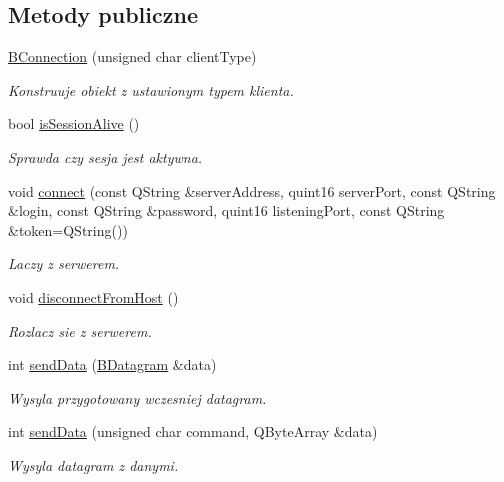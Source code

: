 \subsection*{Metody publiczne}
\begin{DoxyCompactItemize}
\item 
\hyperlink{class_b_connection_ac9dfcf1eed50d5ac3636cb2256b208e9}{BConnection} (unsigned char clientType)
\begin{DoxyCompactList}\small\item\em Konstruuje obiekt z ustawionym typem klienta. \item\end{DoxyCompactList}\item 
bool \hyperlink{class_b_connection_a5a4985b2a3f559b448ce6660ba353acb}{isSessionAlive} ()
\begin{DoxyCompactList}\small\item\em Sprawda czy sesja jest aktywna. \item\end{DoxyCompactList}\item 
void \hyperlink{class_b_connection_aac501a13f453169ed00bc3d4f8664040}{connect} (const QString \&serverAddress, quint16 serverPort, const QString \&login, const QString \&password, quint16 listeningPort, const QString \&token=QString())
\begin{DoxyCompactList}\small\item\em Laczy z serwerem. \item\end{DoxyCompactList}\item 
void \hyperlink{class_b_connection_a9035d3ca3836f1c841e0f91327753f14}{disconnectFromHost} ()
\begin{DoxyCompactList}\small\item\em Rozlacz sie z serwerem. \item\end{DoxyCompactList}\item 
int \hyperlink{class_b_connection_a53b6835b9124709e108913103049910b}{sendData} (\hyperlink{class_b_datagram}{BDatagram} \&data)
\begin{DoxyCompactList}\small\item\em Wysyla przygotowany wczesniej datagram. \item\end{DoxyCompactList}\item 
int \hyperlink{class_b_connection_a77f411c1ec683bd571f41023609f2e7f}{sendData} (unsigned char command, QByteArray \&data)
\begin{DoxyCompactList}\small\item\em Wysyla datagram z danymi. \item\end{DoxyCompactList}\item 

\end{DoxyCompactItemize}
